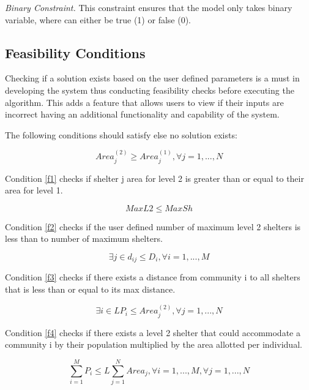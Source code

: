 	\textit{Binary Constraint.} This constraint ensures that the model only takes binary variable, where can either be true (1) or false (0).
	
\subsection{Feasibility Conditions}

	Checking if a solution exists based on the user defined parameters is a must in developing the system thus conducting feasibility checks before executing the algorithm. This adds a feature that allows users to view if their inputs are incorrect having an additional functionality and capability of the system.
	
	The following conditions should satisfy else no solution exists:
	
	\begin{equation} 
		\label{f1}
		Area_{j}^{(2)} \ge Area_{j}^{(1)}, \forall j = 1, ..., N
	\end{equation}
	
	Condition \ref{f1} checks if shelter j area for level 2 is greater than or equal to their area for level 1. 
	
	\begin{equation} 
		\label{f2}
		MaxL2 \le MaxSh
	\end{equation}
	
	Condition \ref{f2} checks if the user defined number of maximum level 2 shelters is less than to number of maximum shelters.
	
	\begin{equation} 
		\label{f3}
		\exists j \in d_{ij} \le D_{i}, \forall i = 1, ..., M
	\end{equation}
	
	Condition \ref{f3} checks if there exists a distance from community i to all shelters that is less than or equal to its max distance.
	
	\begin{equation} 
		\label{f4}
		\exists i \in LP_{i} \le Area_{j}^{(2)}, \forall j = 1, ..., N
	\end{equation}
	
	Condition \ref{f4} checks if there exists a level 2 shelter that could accommodate a community i by their population multiplied by the area allotted per individual. 
	
	\begin{equation} 
		\label{f5}
		\sum_{i=1}^{M}P_{i} \le L\sum_{j=1}^{N}Area_{j}, \forall i=1,...,M,  \forall j=1,...,N
	\end{equation}
	
